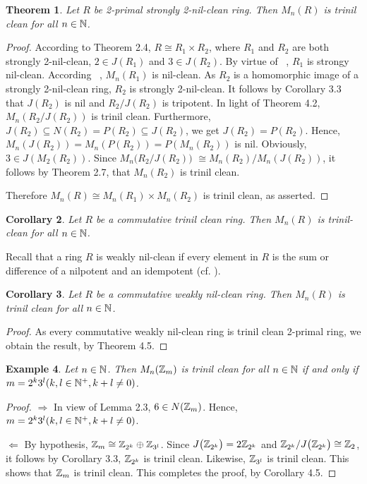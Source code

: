 \documentclass[12pt, reqno]{amsart}
\newtheorem{thm}{Theorem}[section]
\newtheorem{cor}[thm]{Corollary}
\newtheorem{exam}[thm]{Example}
\numberwithin{equation}{section}
\begin{document}
\begin{thm} Let $R$ be 2-primal strongly 2-nil-clean ring. Then $M_n(R)$ is trinil clean for all $n\in {\Bbb N}$.\end{thm}
\begin{proof} According to Theorem 2.4,
$R\cong R_1\times R_2$, where $R_1$ and $R_2$ are both strongly 2-nil-clean, $2\in J(R_1)$ and $3\in J(R_2)$.
By virtue of ~\cite[Theorem 2.11]{CS}, $R_1$ is strongy nil-clean. According ~\cite [Theorem 6.1] {KWZ}, $M_n(R_1)$ is nil-clean.
As $R_2$ is a homomorphic image of a strongly 2-nil-clean ring, $R_2$ is strongly 2-nil-clean. It follows by Corollary 3.3 that $J(R_2)$ is nil and $R_2/J(R_2)$ is tripotent.
In light of Theorem 4.2, $M_n(R_2/J(R_2))$ is trinil clean. Furthermore,
$J(R_2)\subseteq N(R_2)=P(R_2)\subseteq J(R_2)$, we get $J(R_2)=P(R_2)$. Hence, $M_n(J(R_2))=M_n(P(R_2))=P(M_n(R_2))$ is nil. Obviously, $3\in J(M_2(R_2))$.
Since $M_n\big(R_2/J(R_2)\big)$ $\cong M_n(R_2)/M_n(J(R_2))$, it follows by Theorem 2.7, that $M_n(R_2)$ is trinil clean.

Therefore $M_n(R)\cong M_n(R_1)\times M_n(R_2)$ is trinil clean, as asserted.\end{proof}

\begin{cor} Let $R$ be
a commutative trinil clean ring. Then $M_n(R)$ is trinil-clean for all $n\in {\Bbb N}$.\end{cor}

Recall that a ring $R$ is weakly nil-clean if every element in $R$ is the sum or difference of a nilpotent and an idempotent (cf. \cite{KZ}).

\begin{cor} Let $R$ be a commutative weakly nil-clean ring. Then $M_n(R)$ is trinil clean for all $n\in {\Bbb N}$.\end{cor}
\begin{proof} As every commutative weakly nil-clean ring is trinil clean 2-primal ring, we obtain the result, by Theorem 4.5.\end{proof}

\begin{exam} Let $n\in {\Bbb N}$. Then $M_n ({\Bbb Z}_{m})$ is trinil clean for all $n\in {\Bbb N}$ if and only if
$m=2^k3^l (k,l\in {\Bbb N}^+, k+l\neq 0)$.
\end{exam}
\begin{proof} $\Longrightarrow $ In view of Lemma 2.3, $6\in N({\Bbb Z}_m)$. Hence, $m=2^k3^l (k,l\in {\Bbb N}^+, k+l\neq 0)$.

$\Longleftarrow $ By hypothesis, ${\Bbb Z}_m\cong {\Bbb Z}_{2^k}\oplus {\Bbb Z}_{3^l}$. Since $J\big({\Bbb Z}_{2^k}\big)=2{\Bbb Z}_{2^k}$ and ${\Bbb Z}_{2^k}/J\big({\Bbb Z}_{2^k}\big)\cong {\Bbb Z}_2$, it follows by Corollary 3.3, ${\Bbb Z}_{2^k}$ is trinil clean. Likewise, ${\Bbb Z}_{3^l}$ is trinil clean.
This shows that ${\Bbb Z}_m$ is trinil clean. This completes the proof, by Corollary 4.5.\end{proof}
\end{document}
